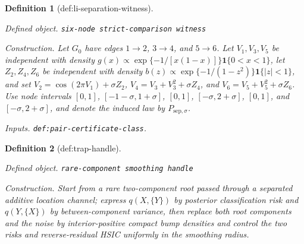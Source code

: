 \documentclass{article}
\newtheorem{definition}{Definition}
\begin{document}
\begin{definition}[def:li-separation-witness]\label{def:li-separation-witness}
\par\smallskip\noindent\emph{Defined object.} \texttt{six-\allowbreak{}node strict-\allowbreak{}comparison witness}
\par\smallskip\noindent\emph{Construction.} Let \(G_0\) have edges \(1\to2\), \(3\to4\), and \(5\to6\). Let \(V_1,V_3,V_5\) be independent with density \(g(x)\propto\exp\{-1/[x(1-x)]\}\mathbf 1\{0<x<1\}\), let \(Z_2,Z_4,Z_6\) be independent with density \(b(z)\propto\exp\{-1/(1-z^2)\}\mathbf 1\{|z|<1\}\), and set \(V_2=\cos(2\pi V_1)+\sigma Z_2\), \(V_4=V_3+V_3^2+\sigma Z_4\), and \(V_6=V_5+V_5^2+\sigma Z_6\). Use node intervals \([0,1]\), \([-1-\sigma,1+\sigma]\), \([0,1]\), \([-\sigma,2+\sigma]\), \([0,1]\), and \([-\sigma,2+\sigma]\), and denote the induced law by \(P_{\mathrm{sep},\sigma}\).
\par\smallskip\noindent\emph{Inputs.} \texttt{def:\allowbreak{}pair-\allowbreak{}certificate-\allowbreak{}class}.
\end{definition}

\begin{definition}[def:trap-handle]\label{def:trap-handle}
\par\smallskip\noindent\emph{Defined object.} \texttt{rare-\allowbreak{}component smoothing handle}
\par\smallskip\noindent\emph{Construction.} Start from a rare two-component root passed through a separated additive location channel; express \(q(X,\{Y\})\) by posterior classification risk and \(q(Y,\{X\})\) by between-component variance, then replace both root components and the noise by interior-positive compact bump densities and control the two risks and reverse-residual HSIC uniformly in the smoothing radius.
\end{definition}
\end{document}
